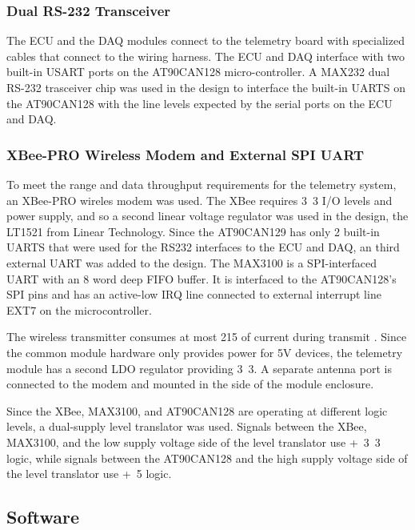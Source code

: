 \subsubsection{Dual RS-232 Transceiver}

The ECU and the DAQ modules connect to the telemetry board with specialized cables that connect to the wiring harness. The ECU and DAQ interface with two built-in USART ports on the AT90CAN128 micro-controller. A MAX232 dual RS-232 trasceiver chip was used in the design to interface the built-in UARTS on the AT90CAN128 with the line levels expected by the serial ports on the ECU and DAQ.

\subsubsection{XBee-PRO Wireless Modem and External SPI UART}

To meet the range and data throughput requirements for the telemetry system, an XBee-PRO wireles modem was used. The XBee requires \unit{3.3}{\volt} I/O levels and power supply, and so a second linear voltage regulator was used in the design, the LT1521 from Linear Technology. Since the AT90CAN129 has only 2 built-in UARTS that were used for the RS232 interfaces to the ECU and DAQ, an third external UART was added to the design. The MAX3100 is a SPI-interfaced UART with an 8 word deep FIFO buffer. It is interfaced to the AT90CAN128's SPI pins and has an active-low IRQ line connected to external interrupt line EXT7 on the microcontroller.

The wireless transmitter consumes at most \unit{215}{\milli\ampere} of current during transmit \cite{XBeeManual}. Since the common module hardware only provides power for 5V devices, the telemetry module has a second LDO regulator providing \unit{3.3}{\volt}. A separate antenna port is connected to the modem and mounted in the side of the module enclosure.

Since the XBee, MAX3100, and AT90CAN128 are operating at different logic levels, a dual-supply level translator was used. Signals between the XBee, MAX3100, and the low supply voltage side of the level translator use \unit{+3.3}{\volt} logic, while signals between the AT90CAN128 and the high supply voltage side of the level translator use \unit{+5}{\volt} logic.

\subsection{Software}

